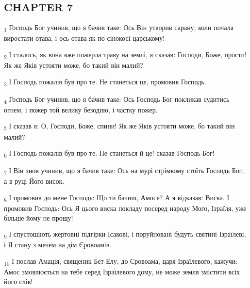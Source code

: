 \subsection{CHAPTER 7}
\begin{tcolorbox}
\textsubscript{1} Господь Бог учинив, що я бачив таке: Ось Він утворив сарану, коли почала виростати отава, і ось отава як по сінокосі царському!
\end{tcolorbox}
\begin{tcolorbox}
\textsubscript{2} І сталось, як вона вже пожерла траву на землі, я сказав: Господи, Боже, прости! Як же Яків устояти може, бо такий він малий?
\end{tcolorbox}
\begin{tcolorbox}
\textsubscript{3} І Господь пожалів був про те. Не станеться це, промовив Господь.
\end{tcolorbox}
\begin{tcolorbox}
\textsubscript{4} Господь Бог учинив, що я бачив таке: Ось Господь Бог покликав судитись огнем, і пожер той велику безодню, і частку пожер.
\end{tcolorbox}
\begin{tcolorbox}
\textsubscript{5} І сказав я: О, Господи, Боже, спини! Як же Яків устояти може, бо такий він малий?
\end{tcolorbox}
\begin{tcolorbox}
\textsubscript{6} І Господь пожалів був про те. Не станеться й це! сказав Господь Бог!
\end{tcolorbox}
\begin{tcolorbox}
\textsubscript{7} І Він знов учинив, що я бачив таке: Ось на мурі стрімкому стоїть Господь Бог, а в руці Його висок.
\end{tcolorbox}
\begin{tcolorbox}
\textsubscript{8} І промовив до мене Господь: Що ти бачиш, Амосе? А я відказав: Виска. І промовив Господь: Ось Я цього виска покладу посеред народу Мого, Ізраїля, уже більше йому не прощу!
\end{tcolorbox}
\begin{tcolorbox}
\textsubscript{9} І спустошіють жертовні підгірки Ісакові, і поруйновані будуть святині Ізраїлеві, і Я стану з мечем на дім Єровоамів.
\end{tcolorbox}
\begin{tcolorbox}
\textsubscript{10} І послав Амація, священик Бет-Елу, до Єровоама, царя Ізраїлевого, кажучи: Амос змовлюється на тебе серед Ізраїлевого дому, не може земля змістити всіх його слів!
\end{tcolorbox}
